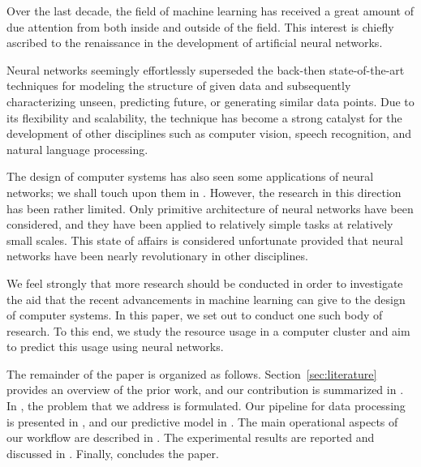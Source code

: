 Over the last decade, the field of machine learning has received a great amount
of due attention from both inside and outside of the field. This interest is
chiefly ascribed to the renaissance in the development of artificial neural
networks.

Neural networks seemingly effortlessly superseded the back-then state-of-the-art
techniques for modeling the structure of given data and subsequently
characterizing unseen, predicting future, or generating similar data points. Due
to its flexibility and scalability, the technique has become a strong catalyst
for the development of other disciplines such as computer vision, speech
recognition, and natural language processing.

The design of computer systems has also seen some applications of neural
networks; we shall touch upon them in . However, the research
in this direction has been rather limited. Only primitive architecture of neural
networks have been considered, and they have been applied to relatively simple
tasks at relatively small scales. This state of affairs is considered
unfortunate provided that neural networks have been nearly revolutionary in
other disciplines.

We feel strongly that more research should be conducted in order to investigate
the aid that the recent advancements in machine learning can give to the design
of computer systems. In this paper, we set out to conduct one such body of
research. To this end, we study the resource usage in a computer cluster and aim
to predict this usage using neural networks.

The remainder of the paper is organized as follows. Section~\ref{sec:literature}
provides an overview of the prior work, and our contribution is summarized in
. In , the problem that we address is
formulated. Our pipeline for data processing is presented in , and
our predictive model in . The main operational aspects of our
workflow are described in . The experimental results are
reported and discussed in . Finally,  concludes
the paper.
